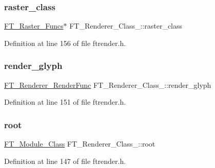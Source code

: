 \subsubsection{\texorpdfstring{raster\_class}{raster\_class}}
{\footnotesize\ttfamily \mbox{\hyperlink{ftimage_8h_aacdff3aaf6e2dea8cfd9c3b90e15728c}{F\+T\+\_\+\+Raster\+\_\+\+Funcs}}$\ast$ F\+T\+\_\+\+Renderer\+\_\+\+Class\+\_\+\+::raster\+\_\+class}



Definition at line 156 of file ftrender.\+h.

\mbox{\label{struct_f_t___renderer___class___a7a022b8358ce3a06620c62f3542d0d2b}} 
\subsubsection{\texorpdfstring{render\_glyph}{render\_glyph}}
{\footnotesize\ttfamily \mbox{\hyperlink{ftrender_8h_af45e60c86537cf1989bf4e654e2b76e7}{F\+T\+\_\+\+Renderer\+\_\+\+Render\+Func}} F\+T\+\_\+\+Renderer\+\_\+\+Class\+\_\+\+::render\+\_\+glyph}



Definition at line 151 of file ftrender.\+h.

\mbox{\label{struct_f_t___renderer___class___a3df4509f1de704596bf4237d6ff8cbd4}} 
\subsubsection{\texorpdfstring{root}{root}}
{\footnotesize\ttfamily \mbox{\hyperlink{ftmodapi_8h_a1bdc5c23cae8b7c61c05966edc4e8343}{F\+T\+\_\+\+Module\+\_\+\+Class}} F\+T\+\_\+\+Renderer\+\_\+\+Class\+\_\+\+::root}



Definition at line 147 of file ftrender.\+h.

\mbox{\label{struct_f_t___renderer___class___a7cfd4795107157aad4f7efcab77a0f64}} 
